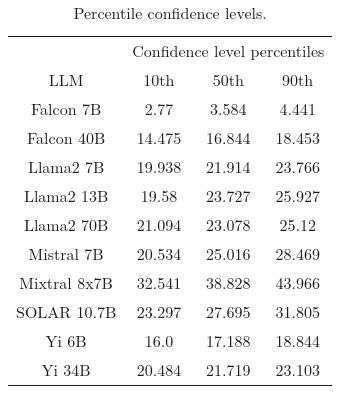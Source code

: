 \begin{table*}
\centering
\begin{tabular}{c|c|c|c}
& \multicolumn{3}{c}{Confidence level percentiles} \\ 
LLM & 10th & 50th & 90th\\ \hline
Falcon 7B & 2.77 & 3.584 & 4.441\\
Falcon 40B & 14.475 & 16.844 & 18.453\\
Llama2 7B & 19.938 & 21.914 & 23.766\\
Llama2 13B & 19.58 & 23.727 & 25.927\\
Llama2 70B & 21.094 & 23.078 & 25.12\\
Mistral 7B & 20.534 & 25.016 & 28.469\\
Mixtral 8x7B & 32.541 & 38.828 & 43.966\\
SOLAR 10.7B & 23.297 & 27.695 & 31.805\\
Yi 6B & 16.0 & 17.188 & 18.844\\
Yi 34B & 20.484 & 21.719 & 23.103\\
\hline
\end{tabular}
\caption{Percentile confidence levels.}
\label{tab:percentile_conf}
\end{table*}
